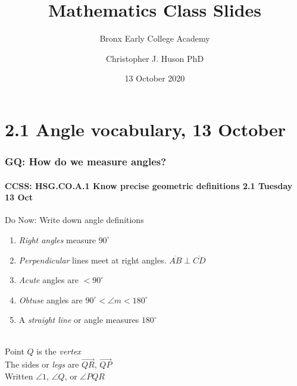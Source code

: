 \documentclass{beamer}
\title{Mathematics Class Slides}
\subtitle{Bronx Early College Academy}
\author{Christopher J. Huson PhD}
\date{13 October 2020}
\begin{document}
\frame{\titlepage}
\section[Outline]{}
\frame{\tableofcontents}

\section{2.1 Angle vocabulary, 13 October}
  \frame
  {
    \frametitle{GQ: How do we measure angles?}
    \framesubtitle{CCSS: HSG.CO.A.1 Know precise geometric definitions  \hfill \alert{2.1 Tuesday 13 Oct}}
  
    \begin{block}{Do Now: Write down angle definitions}
    \begin{enumerate}
        \item \emph{Right angles} measure $90^\circ$
        \item \emph{Perpendicular} lines meet at right angles. $\overline{AB} \perp \overline{CD}$
        \item \emph{Acute} angles are $< 90^\circ$
        \item \emph{Obtuse} angles are $90^\circ < \angle m < 180^\circ$
        \item A \emph{straight line} or angle measures $180^\circ$
    \end{enumerate}
    \end{block}
    \begin{multicols}{2}
     \\
    Point $Q$ is the \emph{vertex} \\[0.25cm]
    The sides or \emph{legs} are $\overrightarrow{QR}$, $\overrightarrow{QP}$ \\[0.25cm]
    Written $\angle 1$, $\angle Q$, or $\angle PQR$
  \end{multicols}
  }
\end{document}
